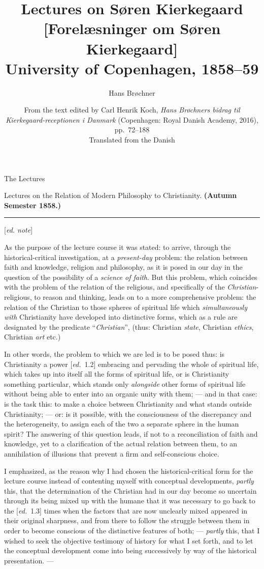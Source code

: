 \documentclass[12pt,a4paper,openany]{book}
\title{\textbf{Lectures on Søren Kierkegaard}\\[8pt]
  \large [Forelæsninger om Søren Kierkegaard]\\[4pt]
  \normalsize University of Copenhagen, 1858--59}
\author{Hans Brøchner}
\date{From the text edited by Carl Henrik Koch, \textit{Hans Brøchners bidrag
  til Kierkegaard-receptionen i Danmark} (Copenhagen: Royal Danish Academy,
  2016), pp.~72--188\\[10pt]
  \small Translated from the Danish}
\newcommand{\kpage}[1]{\marginnote{\footnotesize\textit{[#1]}}}
\newcommand{\ed}[1]{{\small[\textit{ed.}\ #1]}}
\newcommand{\ednote}[1]{{\small[\textit{ed. note}]}}
\newcommand{\parttitle}[1]{\begin{center}\Large #1\end{center}\par}
\newcommand{\coursetitle}[1]{\par\medskip\noindent #1\par\medskip}
\newcommand{\lecture}[1]{\par\bigskip\noindent{\large #1}\par\nobreak\medskip}
\newcommand{\sepline}{\par\begin{center}\rule{2cm}{0.4pt}\end{center}\par}
\begin{document}
\maketitle
\thispagestyle{empty}
\clearpage

\parttitle{\kpage{72}The Lectures}

\coursetitle{\ed{1.1}
Lectures on the Relation of Modern Philosophy to Christianity.
\textbf{(Autumn Semester 1858.)}}

\sepline

\ednote{}

\lecture{Lecture 1}

As the purpose of the lecture course it was stated: to arrive, through the
historical-critical investigation, at a \emph{present-day} problem: the relation between
faith and knowledge, religion and philosophy, as it is posed in our
day in the question of the possibility of a \emph{science of faith}.
But this problem, which coincides with the problem of the relation of the religious,
and specifically of the \emph{Christian}-religious, to reason and
thinking, leads on to a more comprehensive problem: the relation of the Christian
to those spheres of spiritual life which \emph{simultaneously with}
Christianity have developed into distinctive forms, which
as a rule are designated by the predicate ``\emph{Christian}'', (thus: Christian
\emph{state}, Christian \emph{ethics}, Christian \emph{art} etc.)

In other words, the problem to which we are led is to be
posed thus: is Christianity a power \ed{1.2} embracing and pervading the whole of
spiritual life, which takes up into itself all the forms of
spiritual life, or is Christianity something particular,
which stands only \emph{alongside} other forms of spiritual life without
being able to enter into an organic unity with them; --- and in that case: is
the task this: to make a choice between Christianity and
what stands outside Christianity; --- or: is it possible,
with the consciousness of the discrepancy and the heterogeneity, to
assign each of the two a separate sphere in the human spirit?
\kpage{73}The answering of this question leads, if not to a
reconciliation of faith and knowledge, yet to a clarification of the actual relation
between them, to an annihilation of illusions that prevent
a firm and self-conscious choice.

I emphasized, as the reason why I had chosen the historical-critical
form for the lecture course instead of contenting myself with
conceptual developments, \emph{partly} this, that the determination of the Christian had in
our day become so uncertain through its being mixed up with the
humane that it was necessary to go back to the \ed{1.3} times when
the factors that are now unclearly mixed appeared in their original
sharpness, and from there to follow the struggle between them in order to become
conscious of the distinctive features of both; --- \emph{partly} this, that I wished to seek
the objective testimony of history for what I set forth, and
to let the conceptual development come into being successively by way of the historical
presentation. ---
\end{document}
